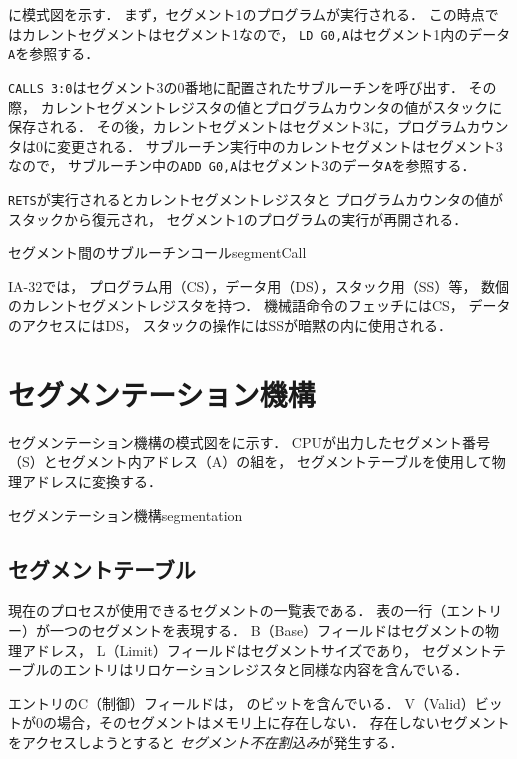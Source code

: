 に模式図を示す．
まず，セグメント1のプログラムが実行される．
この時点ではカレントセグメントはセグメント1なので，
\texttt{LD G0,A}はセグメント1内のデータ\texttt{A}を参照する．

\texttt{CALLS 3:0}はセグメント3の0番地に配置されたサブルーチンを呼び出す．
その際，
カレントセグメントレジスタの値とプログラムカウンタの値がスタックに保存される．
その後，カレントセグメントはセグメント3に，プログラムカウンタは0に変更される．
サブルーチン実行中のカレントセグメントはセグメント3なので，
サブルーチン中の\texttt{ADD G0,A}はセグメント3のデータ\texttt{A}を参照する．

\texttt{RETS}が実行されるとカレントセグメントレジスタと
プログラムカウンタの値がスタックから復元され，
セグメント1のプログラムの実行が再開される．

{セグメント間のサブルーチンコール}{segmentCall}

IA-32では，
プログラム用（CS），データ用（DS），スタック用（SS）等，
数個のカレントセグメントレジスタを持つ．
機械語命令のフェッチにはCS，
データのアクセスにはDS，
スタックの操作にはSSが暗黙の内に使用される\cite{ia32SegmentReg}．


\section{セグメンテーション機構}
セグメンテーション機構の模式図をに示す．
CPUが出力したセグメント番号（S）とセグメント内アドレス（A）の組を，
セグメントテーブルを使用して物理アドレスに変換する．

{セグメンテーション機構}{segmentation}

\subsection{セグメントテーブル}
現在のプロセスが使用できるセグメントの一覧表である．
表の一行（エントリー）が一つのセグメントを表現する．
B（Base）フィールドはセグメントの物理アドレス，
L（Limit）フィールドはセグメントサイズであり，
セグメントテーブルのエントリはリロケーションレジスタと同様な内容を含んでいる．

エントリのC（制御）フィールドは，
のビットを含んでいる．
V（Valid）ビットが0の場合，そのセグメントはメモリ上に存在しない．
存在しないセグメントをアクセスしようとすると
\emph{セグメント不在割込み}が発生する．


